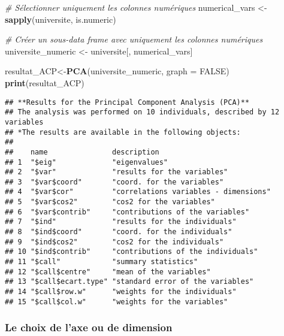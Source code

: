\documentclass[
]{article}
\newenvironment{Shaded}{\begin{snugshade}}{\end{snugshade}}
\newcommand{\AttributeTok}[1]{\textcolor[rgb]{0.13,0.29,0.53}{#1}}
\newcommand{\CommentTok}[1]{\textcolor[rgb]{0.56,0.35,0.01}{\textit{#1}}}
\newcommand{\ConstantTok}[1]{\textcolor[rgb]{0.56,0.35,0.01}{#1}}
\newcommand{\FunctionTok}[1]{\textcolor[rgb]{0.13,0.29,0.53}{\textbf{#1}}}
\newcommand{\NormalTok}[1]{#1}
\newcommand{\OtherTok}[1]{\textcolor[rgb]{0.56,0.35,0.01}{#1}}
\begin{document}
\begin{Shaded}
\begin{Highlighting}[]
\CommentTok{\# Sélectionner uniquement les colonnes numériques}
\NormalTok{numerical\_vars }\OtherTok{\textless{}{-}} \FunctionTok{sapply}\NormalTok{(universite, is.numeric)}

\CommentTok{\# Créer un sous{-}data frame avec uniquement les colonnes numériques}
\NormalTok{universite\_numeric }\OtherTok{\textless{}{-}}\NormalTok{ universite[, numerical\_vars]}
\end{Highlighting}
\end{Shaded}

\begin{Shaded}
\begin{Highlighting}[]
\NormalTok{resultat\_ACP}\OtherTok{\textless{}{-}}\FunctionTok{PCA}\NormalTok{(universite\_numeric, }\AttributeTok{graph =} \ConstantTok{FALSE}\NormalTok{)}
\FunctionTok{print}\NormalTok{(resultat\_ACP)}
\end{Highlighting}
\end{Shaded}

\begin{verbatim}
## **Results for the Principal Component Analysis (PCA)**
## The analysis was performed on 10 individuals, described by 12 variables
## *The results are available in the following objects:
## 
##    name               description                          
## 1  "$eig"             "eigenvalues"                        
## 2  "$var"             "results for the variables"          
## 3  "$var$coord"       "coord. for the variables"           
## 4  "$var$cor"         "correlations variables - dimensions"
## 5  "$var$cos2"        "cos2 for the variables"             
## 6  "$var$contrib"     "contributions of the variables"     
## 7  "$ind"             "results for the individuals"        
## 8  "$ind$coord"       "coord. for the individuals"         
## 9  "$ind$cos2"        "cos2 for the individuals"           
## 10 "$ind$contrib"     "contributions of the individuals"   
## 11 "$call"            "summary statistics"                 
## 12 "$call$centre"     "mean of the variables"              
## 13 "$call$ecart.type" "standard error of the variables"    
## 14 "$call$row.w"      "weights for the individuals"        
## 15 "$call$col.w"      "weights for the variables"
\end{verbatim}

\hypertarget{le-choix-de-laxe-ou-de-dimension}{%
\subsubsection{Le choix de l'axe ou de
dimension}\label{le-choix-de-laxe-ou-de-dimension}}
\end{document}
